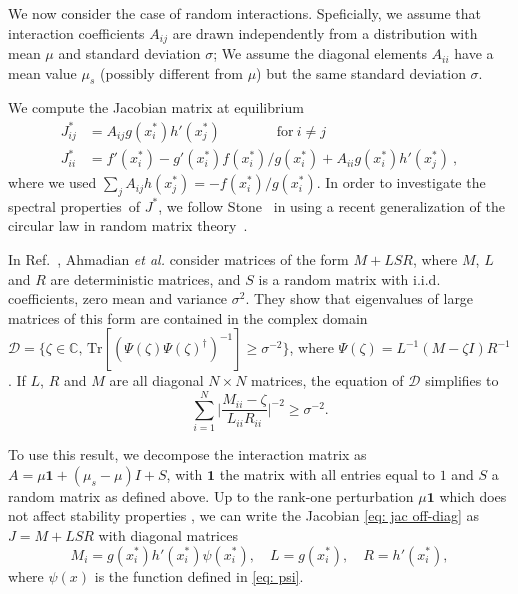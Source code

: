 We now consider the case of random interactions.
Speficially, we assume that interaction coefficients $A_{ij}$ are drawn independently from a distribution with mean $\mu$ and standard deviation $\sigma$;
We assume the diagonal elements $A_{ii}$ have a mean value $\mu_s$ (possibly different from $\mu$) but the same standard deviation $\sigma$. 
 
We compute the Jacobian matrix at equilibrium
\begin{align}
    J_{ij}^* & = A_{ij}g(x_i^*)h'(x_j^*) \qquad \qquad \textrm{for} \ i\neq j \label{eq: jac off-diag}\\
    J_{ii}^* & = f'(x_i^*) - g'(x_i^*)f(x_i^*)/g(x_i^*) + A_{ii}g(x_i^*)h'(x_j^*) \ , \label{eq: jac diag}
\end{align}
where we used $\sum_{j}A_{ij}h(x_j^*)=-f(x_i^*)/g(x_i^*)$.
In order to investigate the spectral properties of $J^*$, 
we follow Stone~\cite{Stone2018} in using a recent generalization of the circular law in random matrix theory~\cite{Ahmadian2015}.

In Ref.~\cite{Ahmadian2015}, Ahmadian \emph{et al.} consider matrices of the form $M + LSR$, where $M$,  
$L$ and $R$ are deterministic matrices, and $S$ is a random matrix with i.i.d. coefficients, zero mean and variance $\sigma^2$.
They show that eigenvalues of large matrices of this form are contained in the complex domain $\mathcal{D} = \{\zeta \in \mathbb{C},\, \textrm{Tr}[(\Psi(\zeta) \Psi(\zeta)^\dagger)^{-1}]\geq \sigma^{-2}\}$, where $\Psi(\zeta) = L^{-1}(M-\zeta I)R^{-1}$. If $L$, $R$ and $M$ are all diagonal $N\times N$ matrices, the equation of $\mathcal{D}$ simplifies to 
\begin{equation}
    \sum_{i=1}^N\Big\vert\frac{M_{ii} - \zeta}{L_{ii}R_{ii}}\Big\vert^{-2}\geq \sigma^{-2}.
\label{eq: domain}
\end{equation}

To use this result, we decompose the interaction matrix as $A = \mu\mathbf{1} + (\mu_s-\mu)I + S$,
with $\mathbf{1}$ the matrix with all entries equal to $1$ and $S$ a random matrix as defined above.
Up to the rank-one perturbation $\mu\mathbf{1}$ which does not affect stability properties \cite{Stone2018}, we can write the Jacobian \eqref{eq: jac off-diag} as $J = M + LSR$ with diagonal matrices
\begin{equation}
    M_i = g(x_i^*)h'(x_i^*)\psi(x_i^*),\quad L = g(x_i^*), \quad R = h'(x_i^*),
\end{equation}
where $\psi(x)$ is the function defined in \eqref{eq: psi}. 


